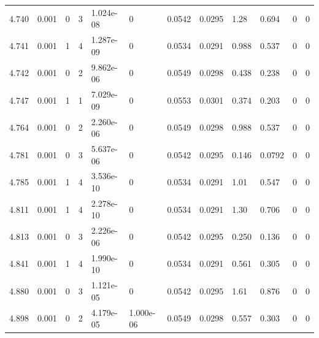 \documentclass[preview]{standalone}
\begin{document}
{{{{{{{{\begin{tabular}{L{1.2cm}C{1.2cm} C{0.3cm}C{0.5cm} C{1.4cm}C{1.4cm} C{1.4cm}C{1.4cm} C{1.6cm}C{1.6cm} C{1.6cm}C{1.6cm}}
  4.740  &  0.001  & 0     &  3 &  1.024e-08  & 0  &  0.0542&   0.0295& 1.28 & 0.694   &  0 & 0  \\ 
  4.741  &  0.001  & 1     &  4 &  1.287e-09  & 0  &  0.0534&   0.0291& 0.988 & 0.537   &  0 & 0  \\ 
  4.742  &  0.001  & 0     &  2 &  9.862e-06  & 0  &  0.0549&   0.0298& 0.438 & 0.238   &  0 & 0  \\ 
  4.747  &  0.001  & 1     &  1 &  7.029e-09  & 0  &  0.0553&   0.0301& 0.374 & 0.203   &  0 & 0  \\ 
  4.764  &  0.001  & 0     &  2 &  2.260e-06  & 0  &  0.0549&   0.0298& 0.988 & 0.537   &  0 & 0  \\ 
  4.781  &  0.001  & 0     &  3 &  5.637e-06  & 0  &  0.0542&   0.0295& 0.146 & 0.0792   &  0 & 0  \\ 
  4.785  &  0.001  & 1     &  4 &  3.536e-10  & 0  &  0.0534&   0.0291& 1.01 & 0.547   &  0 & 0  \\ 
  4.811  &  0.001  & 1     &  4 &  2.278e-10  & 0  &  0.0534&   0.0291& 1.30 & 0.706   &  0 & 0  \\ 
  4.813  &  0.001  & 0     &  3 &  2.226e-06  & 0  &  0.0542&   0.0295& 0.250 & 0.136   &  0 & 0  \\ 
  4.841  &  0.001  & 1     &  4 &  1.990e-10  & 0  &  0.0534&   0.0291& 0.561 & 0.305   &  0 & 0  \\ 
  4.880  &  0.001  & 0     &  3 &  1.121e-05  & 0  &  0.0542&   0.0295& 1.61 & 0.876   &  0 & 0  \\ 
  4.898  &  0.001  & 0     &  2 &  4.179e-05  & 1.000e-06  &  0.0549&   0.0298& 0.557 & 0.303   &  0 & 0  \\ 
\hline 
\end{tabular} 

}}}}}}}}
\end{document}
